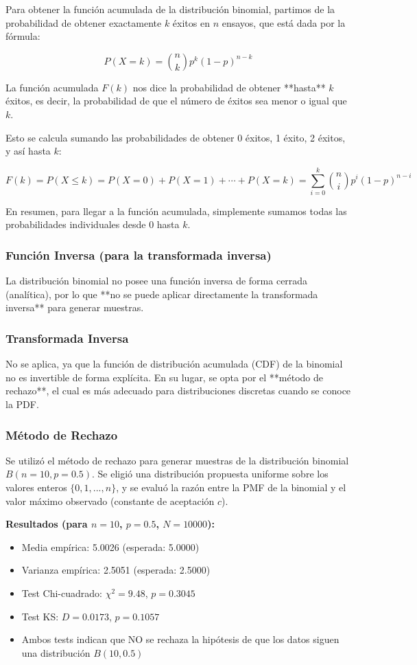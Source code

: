\documentclass{article}
\begin{document}
Para obtener la función acumulada de la distribución binomial, partimos de la probabilidad de obtener exactamente \(k\) éxitos en \(n\) ensayos, que está dada por la fórmula:

\[
P(X = k) = \binom{n}{k} p^k (1-p)^{n-k}
\]

La función acumulada \(F(k)\) nos dice la probabilidad de obtener **hasta** \(k\) éxitos, es decir, la probabilidad de que el número de éxitos sea menor o igual que \(k\).

Esto se calcula sumando las probabilidades de obtener 0 éxitos, 1 éxito, 2 éxitos, y así hasta \(k\):

\[
F(k) = P(X \leq k) = P(X=0) + P(X=1) + \cdots + P(X=k) = \sum_{i=0}^k \binom{n}{i} p^i (1-p)^{n-i}
\]

En resumen, para llegar a la función acumulada, simplemente sumamos todas las probabilidades individuales desde 0 hasta \(k\).


\subsubsection*{Función Inversa (para la transformada inversa)}
La distribución binomial no posee una función inversa de forma cerrada (analítica), por lo que **no se puede aplicar directamente la transformada inversa** para generar muestras.

\vspace{0.5em}
\subsubsection{Transformada Inversa}
No se aplica, ya que la función de distribución acumulada (CDF) de la binomial no es invertible de forma explícita. En su lugar, se opta por el **método de rechazo**, el cual es más adecuado para distribuciones discretas cuando se conoce la PDF.

\vspace{0.5em}
\subsubsection{Método de Rechazo}
Se utilizó el método de rechazo para generar muestras de la distribución binomial $B(n=10, p=0.5)$. Se eligió una distribución propuesta uniforme sobre los valores enteros $\{0, 1, ..., n\}$, y se evaluó la razón entre la PMF de la binomial y el valor máximo observado (constante de aceptación $c$).

\textbf{Resultados (para $n=10$, $p=0.5$, $N=10000$):}
\begin{itemize}
    \item Media empírica: 5.0026 \hfill (esperada: 5.0000)
    \item Varianza empírica: 2.5051 \hfill (esperada: 2.5000)
    \item Test Chi-cuadrado: $\chi^2 = 9.48$, $p = 0.3045$
    \item Test KS: $D = 0.0173$, $p = 0.1057$
    \item Ambos tests indican que NO se rechaza la hipótesis de que los datos siguen una distribución $B(10, 0.5)$
\end{itemize}
\end{document}
